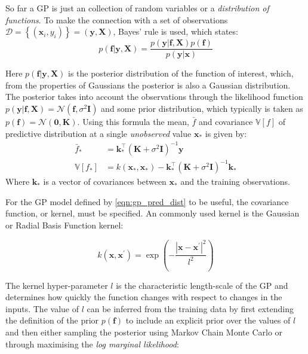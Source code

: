 So far a GP is just an collection of random variables or a \emph{distribution of functions}.  To make the connection with a set of observations $\mathcal{D}=\left\{(\mathbf{x}_{i}, y_{i})\right\} = (\mathbf{y}, \mathbf{X})$, Bayes' rule is used, which states: 
\begin{equation}\label{eqn:ya_boy_bayes}
    p(\mathbf{f}|\mathbf{y}, \mathbf{X})  = \frac{p(\mathbf{y}|\mathbf{f}, \mathbf{X})p(\mathbf{f})}{p(\mathbf{y}|\mathbf{x})}
\end{equation}

Here $p(\mathbf{f}|\mathbf{y}, \mathbf{X})$ is the posterior distribution of the function of interest, which, from the properties of Gaussians the posterior is also a Gaussian distribution. The posterior takes into account the observations through the likelihood function $p(\mathbf{y}|\mathbf{f}, \mathbf{X}) = \mathcal{N}(\mathbf{f}, \sigma^{2}\mathbf{I})$ and some prior distribution, which typically is taken as $p(\mathbf{f}) = \mathcal{N}(\mathbf{0}, \mathbf{K})$.  Using this formula the mean, $\bar{f}$ and covariance $\mathbb{V}\left[f\right]$ of predictive distribution at a single  \emph{unobserved} value $\mathbf{x}_{*}$ is given by: 
\begin{equation}\label{eqn:gp_pred_dist}
\begin{aligned}
\bar{f}_{*} &=\mathbf{k}_{*}^{\top}\left(\mathbf{K}+\sigma^{2} \mathbf{I}\right)^{-1} \mathbf{y} \\
\mathbb{V}\left[f_{*}\right] &=k\left(\mathbf{x}_{*}, \mathbf{x}_{*}\right)-\mathbf{k}_{*}^{\top}\left(\mathbf{K}+\sigma^{2} \mathbf{I}\right)^{-1} \mathbf{k}_{*}
\end{aligned}
\end{equation}
Where $\mathbf{k}_{*}$ is a vector of covariances between $\mathbf{x}_{*}$ and the training observations. 

For the GP model defined by \ref{eqn:gp_pred_dist} to be useful, the covariance function, or kernel, must be specified. An commonly used kernel is the Gaussian or Radial Basis Function kernel: 

\begin{equation}
    k(\mathbf{x}, \mathbf{x}^{\prime}) = \exp{\left(-\frac{\left|\mathbf{x}-\mathbf{x}^{\prime}\right|^{2}}{l^{2}}\right)}
\end{equation}

The kernel hyper-parameter $l$ is the characteristic length-scale of the GP and determines how quickly the function changes with respect to changes in the inputs. The value of $l$ can be inferred from the training data by first extending the definition of the prior $p(\mathbf{f})$ to include an explicit prior over the values of $l$ and then either sampling the posterior using Markov Chain Monte Carlo or through maximising the \emph{log marginal likelihood}: 

